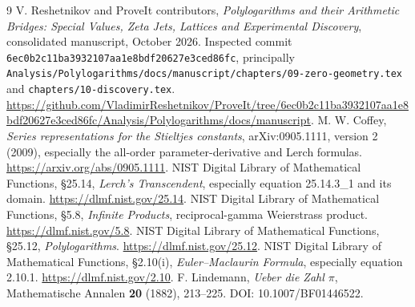 \documentclass[11pt,letterpaper]{article}
\numberwithin{equation}{section}
\theoremstyle{definition}\newtheorem{definition}[theorem]{Definition}
\theoremstyle{remark}\newtheorem{remark}[theorem]{Remark}
\newcommand{\src}[1]{\nolinkurl{#1}}
\begin{document}
\begin{thebibliography}{9}
 V. Reshetnikov and ProveIt contributors, \emph{Polylogarithms and their Arithmetic Bridges: Special Values, Zeta Jets, Lattices and Experimental Discovery}, consolidated manuscript, October 2026. Inspected commit \src{6ec0b2c11ba3932107aa1e8bdf20627e3ced86fc}, principally \src{Analysis/Polylogarithms/docs/manuscript/chapters/09-zero-geometry.tex} and \src{chapters/10-discovery.tex}. \url{https://github.com/VladimirReshetnikov/ProveIt/tree/6ec0b2c11ba3932107aa1e8bdf20627e3ced86fc/Analysis/Polylogarithms/docs/manuscript}.
 M. W. Coffey, \emph{Series representations for the Stieltjes constants}, arXiv:0905.1111, version 2 (2009), especially the all-order parameter-derivative and Lerch formulas. \url{https://arxiv.org/abs/0905.1111}.
 NIST Digital Library of Mathematical Functions, \S25.14, \emph{Lerch's Transcendent}, especially equation 25.14.3\_1 and its domain. \url{https://dlmf.nist.gov/25.14}.
 NIST Digital Library of Mathematical Functions, \S5.8, \emph{Infinite Products}, reciprocal-gamma Weierstrass product. \url{https://dlmf.nist.gov/5.8}.
 NIST Digital Library of Mathematical Functions, \S25.12, \emph{Polylogarithms}. \url{https://dlmf.nist.gov/25.12}.
 NIST Digital Library of Mathematical Functions, \S2.10(i), \emph{Euler--Maclaurin Formula}, especially equation 2.10.1. \url{https://dlmf.nist.gov/2.10}.
 F. Lindemann, \emph{Ueber die Zahl $\pi$}, Mathematische Annalen \textbf{20} (1882), 213--225. DOI: 10.1007/BF01446522.
\end{thebibliography}
\end{document}

